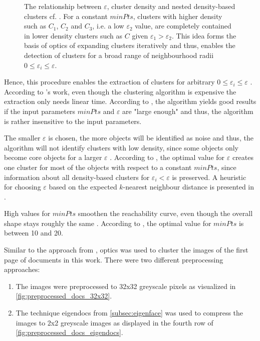 \begin{figure}[htp] %
    \centering
    
    \caption{The relationship between $\varepsilon$, cluster density and nested density-based clusters cf. \cite{OPTICS1999}.
    For a constant $minPts$, clusters with higher density such as $C_1$, $C_2$ and $C_3$, i.e. a low $\varepsilon_2$ value, 
    are completely contained in lower density clusters such as $C$ given $\varepsilon_1 > \varepsilon_2$.
    This idea forms the basis of \ac{optics} of expanding clusters iteratively and thus, 
    enables the detection of clusters for a broad range of neighbourhood radii $0 \le \varepsilon_i \le \varepsilon$.
    }
    \label{fig:nested_density_cluster}
\end{figure}

Hence, this procedure enables the extraction of clusters for arbitrary $0 \le \varepsilon_i \le \varepsilon$ \cite{OPTICS_kMeans_2016, OPTICS1999}.
According to \citeauthor{OPTICS2013}'s work, even though the clustering algorithm is expensive the extraction only needs linear time.
According to \cite{OPTICS1999}, the algorithm yields good results if the input parameters $minPts$ and $\varepsilon$ are "large enough" and thus, the algorithm is rather insensitive to the input parameters.

The smaller $\varepsilon$ is chosen, the more objects will be identified as noise and thus, the algorithm will not identify clusters with low density, 
since some objects only become core objects for a larger $\varepsilon$ \cite{OPTICS1999}.
According to \citeauthor{OPTICS1999}, the optimal value for $\varepsilon$ creates one cluster for most of the objects with respect to a constant $minPts$,
since information about all density-based clusters for $\varepsilon_i < \varepsilon$ is preserved.
A heuristic for choosing $\varepsilon$ based on the expected $k$-nearest neighbour distance is presented in \cite{OPTICS1999}.

High values for $minPts$ smoothen the reachability curve, even though the overall shape stays roughly the same \cite{OPTICS1999}.
According to \citeauthor{OPTICS1999}, the optimal value for $minPts$ is between 10 and 20.

Similar to the approach from \cite{OPTICS1999}, \ac{optics} was used to cluster the images of the first page of documents in this work.
There were two different preprocessing approaches:
\begin{enumerate}
    \item \label{pt:32}The images were preprocessed to 32x32 greyscale pixels as visualized in \autoref{fig:preprocessed_docs_32x32}.
    \item \label{pt:eigendocs}The technique eigendocs from \autoref{subsec:eigenface} 
    was used to compress the images to 2x2 greyscale images as displayed in the fourth row of \autoref{fig:preprocessed_docs_eigendocs}.
\end{enumerate}

